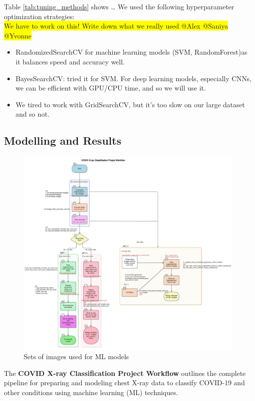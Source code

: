 \documentclass{article}
\begin{document}
Table \ref{tab:tuning_methods} shows \dots
We used the following hyperparameter optimization strategies: \\
\colorbox{yellow}{We have to work on this! Write down what we really used @Alex @Saniya @Yvonne}
\begin{itemize}
    \item RandomizedSearchCV for machine learning models (SVM, RandomForest)as it balances speed and accuracy well.
    \item BayesSearchCV: tried it for SVM. For deep learning models, especially CNNs, we can be efficient with GPU/CPU time, and so we will use it.
    \item We tired to work with GridSearchCV, but it's too slow on our large dataset and so not.
\end{itemize}


\subsection{Modelling and Results}
\begin{figure}%
    \centering
    \includegraphics[width=1.0\linewidth]{diagram-export-5-8-2025-4_05_06-PM.png}
    \caption{Sets of images used for ML models}
    \label{fig:WORKFLOW}
\end{figure}
The \textbf{COVID X-ray Classification Project Workflow} outlines the complete pipeline for preparing and modeling chest X-ray data to classify COVID-19 and other conditions using machine learning (ML) techniques.
\end{document}
